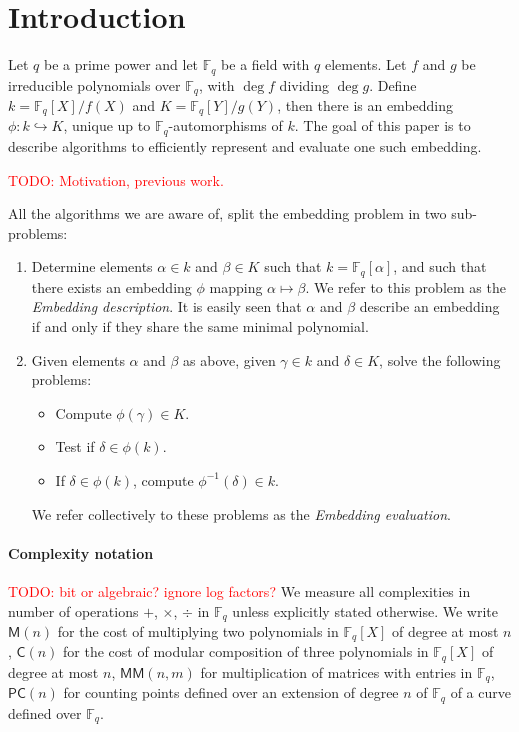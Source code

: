 \documentclass[12pt]{article}
\theoremstyle{plain}
\theoremstyle{definition}
\newcommand{\todo}[1]{\textcolor{red}{TODO: #1}}
\def\F{\ensuremath{\mathbb{F}}}
\def\MM{\ensuremath{\mathsf{M}}}
\def\MMM{\ensuremath{\mathsf{MM}}}
\def\MC{\ensuremath{\mathsf{C}}}
\def\PC{\ensuremath{\mathsf{PC}}}
\newcounter{algorithm}
\begin{document}
\section{Introduction}

Let $q$ be a prime power and let $\F_q$ be a field with $q$
elements. Let $f$ and $g$ be irreducible polynomials over $\F_q$, with
$\deg f$ dividing $\deg g$. Define $k=\F_q[X]/f(X)$ and
$K=\F_q[Y]/g(Y)$, then there is an embedding $\phi:k\hookrightarrow
K$, unique up to $\F_q$-automorphisms of $k$. The goal of this paper
is to describe algorithms to efficiently represent and evaluate one
such embedding.

\todo{Motivation, previous work.}

All the algorithms we are aware of, split the embedding problem in two
sub-problems:
\begin{enumerate}
\item Determine elements $\alpha\in k$ and $\beta\in K$ such that
  $k=\F_q[\alpha]$, and such that there exists an
  embedding $\phi$ mapping $\alpha\mapsto\beta$. We refer to this
  problem as the \emph{Embedding description}.
  It is easily seen that $\alpha$ and $\beta$ describe an embedding
  if and only if they share the same minimal polynomial.
\item Given elements $\alpha$ and $\beta$ as above, given $\gamma\in
  k$ and $\delta\in K$, solve the following problems:
  \begin{itemize}
  \item Compute $\phi(\gamma)\in K$.
  \item Test if $\delta\in\phi(k)$.
  \item If $\delta\in\phi(k)$, compute $\phi^{-1}(\delta)\in k$.
  \end{itemize}
  We refer collectively to these problems as the \emph{Embedding
    evaluation}.
\end{enumerate}

\paragraph{Complexity notation}
\todo{bit or algebraic? ignore log factors?}
We measure all complexities in number
of operations $+$, $\times$, $\div$ in $\F_q$ unless explicitly
stated otherwise. We write $\MM(n)$ for
the cost of multiplying two polynomials in $\F_q[X]$ of degree at most
$n$, $\MC(n)$ for the cost of modular composition of three
polynomials in $\F_q[X]$ of degree at most $n$,
$\MMM(n, m)$ for multiplication of matrices with entries in $\F_q$,
$\PC(n)$ for counting points defined over an extension of
degree $n$ of $\F_q$ of a curve defined over $\F_q$.
\end{document}
